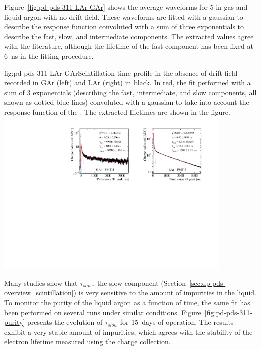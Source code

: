 Figure~\ref{fig:pd-pds-311-LAr-GAr} shows the average waveforms for  5 in gas and liquid argon with no drift field. These waveforms are fitted with a gaussian to describe the response function convoluted with a sum of three exponentials to describe the fast, slow, and intermediate components. 
The extracted values agree with the literature, although the lifetime of the fast component has been fixed at \SI{6}{ns} in the fitting procedure.


\begin{dunefigure}{fig:pd-pds-311-LAr-GAr}{Scintillation time profile in the absence of drift field recorded in GAr (left) and LAr (right) in black. In red, the fit performed with a sum of 3 exponentials (describing the fast, intermediate, and slow components, all shown as dotted blue lines) convoluted with a gaussian to take into account the response function of the . The extracted lifetimes are shown in the figure.}
\includegraphics[width=0.85\textwidth]{graphics/dppd_311_lar_gar_fit.pdf}
\end{dunefigure}

Many studies show that $\tau_{slow}$, the slow component (Section~\ref{sec:dp-pds-overview_scintillation}) is very sensitive to the amount of impurities in the liquid.
To monitor the purity of the liquid argon as a function of time, the same fit has been performed on several runs under similar conditions. 
Figure~\ref{fig:pd-pds-311-purity} presents the evolution of $\tau_{slow}$ for \SI{15}{days} of operation.
The results exhibit a very stable amount of impurities, which agrees with the stability of the electron lifetime measured using the charge collection.

